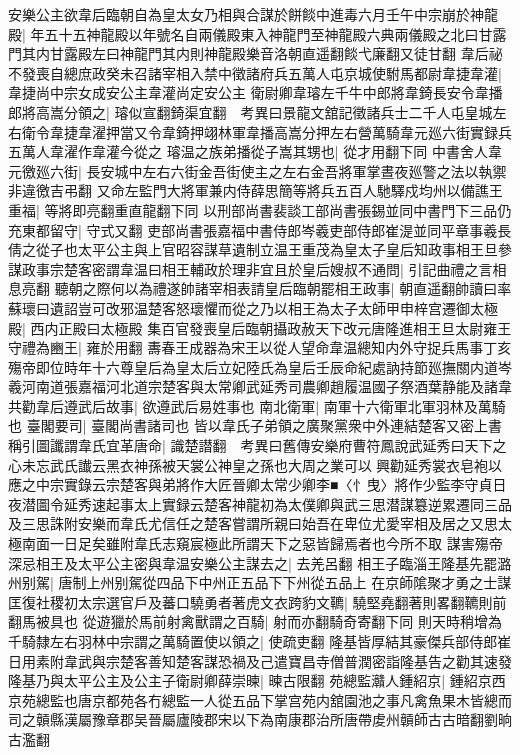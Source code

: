 安樂公主欲韋后臨朝自為皇太女乃相與合謀於餅餤中進毒六月壬午中宗崩於神龍殿|{
	年五十五神龍殿以年號名自兩儀殿東入神龍門至神龍殿六典兩儀殿之北曰甘露門其内甘露殿左曰神龍門其内則神龍殿樂音洛朝直遥翻餤弋廉翻又徒甘翻}
韋后祕不發喪自總庶政癸未召諸宰相入禁中徵諸府兵五萬人屯京城使駙馬都尉韋捷韋灌|{
	韋捷尚中宗女成安公主韋灌尚定安公主}
衛尉卿韋璿左千牛中郎將韋錡長安令韋播郎將高嵩分領之|{
	璿似宣翻錡渠宜翻　考異曰景龍文舘記徵諸兵士二千人屯皇城左右衛令韋捷韋濯押當又令韋錡押翊林軍韋播高嵩分押左右營萬騎韋元廵六街實録兵五萬人韋濯作韋灌今從之}
璿温之族弟播從子嵩其甥也|{
	從才用翻下同}
中書舍人韋元徼廵六街|{
	長安城中左右六街金吾街使主之左右金吾將軍掌晝夜廵警之法以執禦非違徼吉弔翻}
又命左監門大將軍兼内侍薛思簡等將兵五百人馳驛戍均州以備譙王重福|{
	等將即亮翻重直龍翻下同}
以刑部尚書裴談工部尚書張錫並同中書門下三品仍充東都留守|{
	守式又翻}
吏部尚書張嘉福中書侍郎岑羲吏部侍郎崔湜並同平章事羲長倩之從子也太平公主與上官昭容謀草遺制立温王重茂為皇太子皇后知政事相王旦參謀政事宗楚客密謂韋温曰相王輔政於理非宜且於皇后嫂叔不通問|{
	引記曲禮之言相息亮翻}
聽朝之際何以為禮遂帥諸宰相表請皇后臨朝罷相王政事|{
	朝直遥翻帥讀曰率}
蘇瓌曰遺詔豈可改邪温楚客怒瓌懼而從之乃以相王為太子太師甲申梓宫遷御太極殿|{
	西内正殿曰太極殿}
集百官發喪皇后臨朝攝政赦天下改元唐隆進相王旦太尉雍王守禮為豳王|{
	雍於用翻}
夀春王成器為宋王以從人望命韋温總知内外守捉兵馬事丁亥殤帝即位時年十六尊皇后為皇太后立妃陸氏為皇后壬辰命紀處訥持節廵撫關内道岑羲河南道張嘉福河北道宗楚客與太常卿武延秀司農卿趙履温國子祭酒葉静能及諸韋共勸韋后遵武后故事|{
	欲遵武后易姓事也}
南北衛軍|{
	南軍十六衛軍北軍羽林及萬騎也}
臺閣要司|{
	臺閣尚書諸司也}
皆以韋氏子弟領之廣聚黨衆中外連結楚客又密上書稱引圖讖謂韋氏宜革唐命|{
	識楚譛翻　考異曰舊傳安樂府曹符鳳說武延秀曰天下之心未忘武氏䜟云黑衣神孫被天裳公神皇之孫也大周之業可以興勸延秀裳衣皂袍以應之中宗實錄云宗楚客與弟將作大匠晉卿太常少卿李■〈忄曳〉將作少監李守貞日夜潜圖令延秀速起事太上實録云楚客神龍初為太僕卿與武三思潜謀簒逆累遷同三品及三思誅附安樂而韋氏尤信任之楚客嘗謂所親曰始吾在卑位尤愛宰相及居之又思太極南面一日足矣雖附韋氏志窺宸極此所謂天下之惡皆歸焉者也今所不取}
謀害殤帝深忌相王及太平公主密與韋温安樂公主謀去之|{
	去羌呂翻}
相王子臨淄王隆基先罷潞州别駕|{
	唐制上州别駕從四品下中州正五品下下州從五品上}
在京師隂聚才勇之士謀匡復社稷初太宗選官戶及蕃口驍勇者著虎文衣跨豹文韀|{
	驍堅堯翻著則畧翻韀則前翻馬被具也}
從遊獵於馬前射禽獸謂之百騎|{
	射而亦翻騎奇寄翻下同}
則天時稍增為千騎隸左右羽林中宗謂之萬騎置使以領之|{
	使疏吏翻}
隆基皆厚結其豪傑兵部侍郎崔日用素附韋武與宗楚客善知楚客謀恐禍及己遣寶昌寺僧普潤密詣隆基告之勸其速發隆基乃與太平公主及公主子衛尉卿薛崇暕|{
	暕古限翻}
苑總監灨人鍾紹京|{
	鍾紹京西京苑總監也唐京都苑各冇總監一人從五品下掌宫苑内舘園池之事凡禽魚果木皆總而司之贑縣漢屬豫章郡吴晉屬廬陵郡宋以下為南康郡治所唐帶䖍州贑師古古暗翻劉晌古濫翻}
